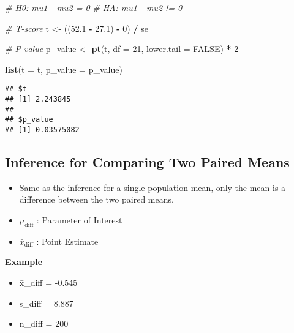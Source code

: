 \documentclass[]{book}
\newenvironment{Shaded}{\begin{snugshade}}{\end{snugshade}}
\newcommand{\CommentTok}[1]{\textcolor[rgb]{0.56,0.35,0.01}{\textit{#1}}}
\newcommand{\DataTypeTok}[1]{\textcolor[rgb]{0.13,0.29,0.53}{#1}}
\newcommand{\DecValTok}[1]{\textcolor[rgb]{0.00,0.00,0.81}{#1}}
\newcommand{\FloatTok}[1]{\textcolor[rgb]{0.00,0.00,0.81}{#1}}
\newcommand{\KeywordTok}[1]{\textcolor[rgb]{0.13,0.29,0.53}{\textbf{#1}}}
\newcommand{\NormalTok}[1]{#1}
\newcommand{\OperatorTok}[1]{\textcolor[rgb]{0.81,0.36,0.00}{\textbf{#1}}}
\newcommand{\OtherTok}[1]{\textcolor[rgb]{0.56,0.35,0.01}{#1}}
\newcommand{\StringTok}[1]{\textcolor[rgb]{0.31,0.60,0.02}{#1}}
\providecommand{\tightlist}{%
  \setlength{\itemsep}{0pt}\setlength{\parskip}{0pt}}
\begin{document}
\begin{Shaded}
\begin{Highlighting}[]
\CommentTok{# H0: mu1 - mu2 = 0}
\CommentTok{# HA: mu1 - mu2 != 0}

\CommentTok{# T-score}
\NormalTok{t <-}\StringTok{ }\NormalTok{((}\FloatTok{52.1} \OperatorTok{-}\StringTok{ }\FloatTok{27.1}\NormalTok{) }\OperatorTok{-}\StringTok{ }\DecValTok{0}\NormalTok{) }\OperatorTok{/}\StringTok{ }\NormalTok{se}

\CommentTok{# P-value}
\NormalTok{p_value <-}\StringTok{ }\KeywordTok{pt}\NormalTok{(t, }\DataTypeTok{df =} \DecValTok{21}\NormalTok{, }\DataTypeTok{lower.tail =} \OtherTok{FALSE}\NormalTok{) }\OperatorTok{*}\StringTok{ }\DecValTok{2}

\KeywordTok{list}\NormalTok{(}\DataTypeTok{t =}\NormalTok{ t, }\DataTypeTok{p_value =}\NormalTok{ p_value)}
\end{Highlighting}
\end{Shaded}

\begin{verbatim}
## $t
## [1] 2.243845
## 
## $p_value
## [1] 0.03575082
\end{verbatim}

\hypertarget{inference-for-comparing-two-paired-means}{%
\subsection*{Inference for Comparing Two Paired Means}\label{inference-for-comparing-two-paired-means}}

\begin{itemize}
\item
  Same as the inference for a single population mean, only the mean is a difference between the two paired means.
\item
  \(\mu_{\text{diff}}\) : Parameter of Interest
\item
  \(\bar{x}_{\text{diff}}\) : Point Estimate
\end{itemize}

\textbf{Example}

\begin{itemize}
\tightlist
\item
  x̄\_diff = -0.545
\item
  s\_diff = 8.887
\item
  n\_diff = 200
\end{itemize}
\end{document}
